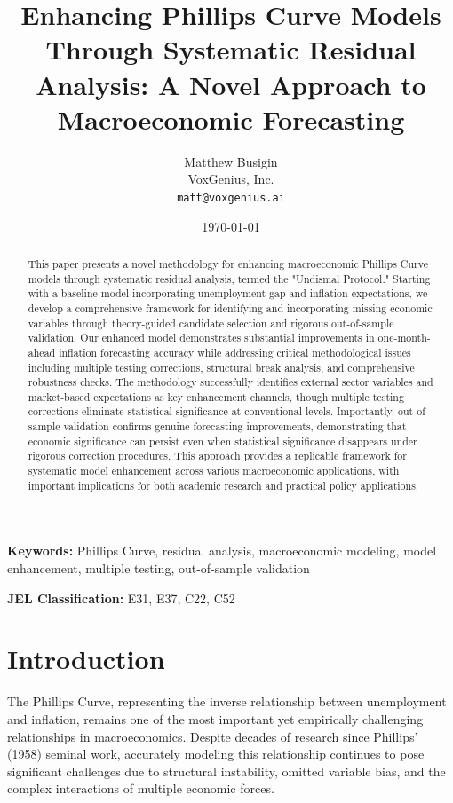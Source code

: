 \documentclass[12pt]{article}
\title{Enhancing Phillips Curve Models Through Systematic Residual Analysis: A Novel Approach to Macroeconomic Forecasting}
\author{Matthew Busigin\\
VoxGenius, Inc.\\
\texttt{matt@voxgenius.ai}}
\date{\today}
\begin{document}
\maketitle

\begin{abstract}
This paper presents a novel methodology for enhancing macroeconomic Phillips Curve models through systematic residual analysis, termed the "Undismal Protocol." Starting with a baseline model incorporating unemployment gap and inflation expectations, we develop a comprehensive framework for identifying and incorporating missing economic variables through theory-guided candidate selection and rigorous out-of-sample validation. Our enhanced model demonstrates substantial improvements in one-month-ahead inflation forecasting accuracy while addressing critical methodological issues including multiple testing corrections, structural break analysis, and comprehensive robustness checks. The methodology successfully identifies external sector variables and market-based expectations as key enhancement channels, though multiple testing corrections eliminate statistical significance at conventional levels. Importantly, out-of-sample validation confirms genuine forecasting improvements, demonstrating that economic significance can persist even when statistical significance disappears under rigorous correction procedures. This approach provides a replicable framework for systematic model enhancement across various macroeconomic applications, with important implications for both academic research and practical policy applications.
\end{abstract}

\textbf{Keywords:} Phillips Curve, residual analysis, macroeconomic modeling, model enhancement, multiple testing, out-of-sample validation

\textbf{JEL Classification:} E31, E37, C22, C52

\section{Introduction}

The Phillips Curve, representing the inverse relationship between unemployment and inflation, remains one of the most important yet empirically challenging relationships in macroeconomics. Despite decades of research since Phillips' (1958) seminal work, accurately modeling this relationship continues to pose significant challenges due to structural instability, omitted variable bias, and the complex interactions of multiple economic forces.
\end{document}
